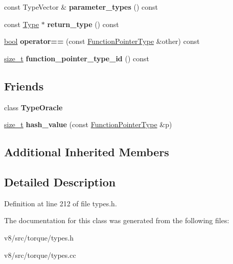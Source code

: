 \begin{DoxyCompactItemize}
\item 
\mbox{\label{classv8_1_1internal_1_1torque_1_1FunctionPointerType_a36cfe6944e53bf5d1102f912685c40ae}} 
const Type\+Vector \& {\bfseries parameter\+\_\+types} () const
\item 
\mbox{\label{classv8_1_1internal_1_1torque_1_1FunctionPointerType_a52b163d07f881fa089563671b49392ed}} 
const \mbox{\hyperlink{classv8_1_1internal_1_1torque_1_1Type}{Type}} $\ast$ {\bfseries return\+\_\+type} () const
\item 
\mbox{\label{classv8_1_1internal_1_1torque_1_1FunctionPointerType_ab510b9bb96db915677dfe9cab8f7fe73}} 
\mbox{\hyperlink{classbool}{bool}} {\bfseries operator==} (const \mbox{\hyperlink{classv8_1_1internal_1_1torque_1_1FunctionPointerType}{Function\+Pointer\+Type}} \&other) const
\item 
\mbox{\label{classv8_1_1internal_1_1torque_1_1FunctionPointerType_ad31f477e48e09910c3e4f460ed450d02}} 
\mbox{\hyperlink{classsize__t}{size\+\_\+t}} {\bfseries function\+\_\+pointer\+\_\+type\+\_\+id} () const
\end{DoxyCompactItemize}
\subsection*{Friends}
\begin{DoxyCompactItemize}
\item 
\mbox{\label{classv8_1_1internal_1_1torque_1_1FunctionPointerType_a7094142f1d9b95b74797a11decbf23e3}} 
class {\bfseries Type\+Oracle}
\item 
\mbox{\label{classv8_1_1internal_1_1torque_1_1FunctionPointerType_acbd45046cb46a39610287d502409d911}} 
\mbox{\hyperlink{classsize__t}{size\+\_\+t}} {\bfseries hash\+\_\+value} (const \mbox{\hyperlink{classv8_1_1internal_1_1torque_1_1FunctionPointerType}{Function\+Pointer\+Type}} \&p)
\end{DoxyCompactItemize}
\subsection*{Additional Inherited Members}


\subsection{Detailed Description}


Definition at line 212 of file types.\+h.



The documentation for this class was generated from the following files\+:\begin{DoxyCompactItemize}
\item 
v8/src/torque/types.\+h\item 
v8/src/torque/types.\+cc\end{DoxyCompactItemize}
